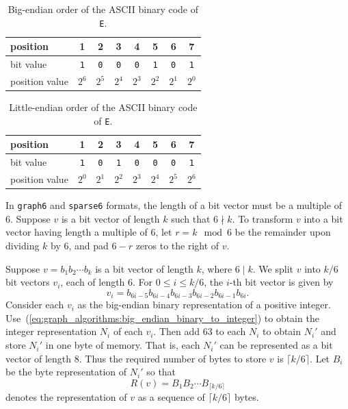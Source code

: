 \begin{table}[!htbp]
\centering
\begin{tabular}{|l|ccccccc|} \hline
position       & 1          & 2          & 3          & 4          & 5          & 6          & 7 \\\hline
bit value      & \texttt{1} & \texttt{0} & \texttt{0} & \texttt{0} & \texttt{1} & \texttt{0} & \texttt{1} \\\hline
position value & $2^6$      & $2^5$      & $2^4$      & $2^3$      & $2^2$      & $2^1$      & $2^0$ \\\hline
\end{tabular}
\caption{Big-endian order of the ASCII binary code of \texttt{E}.}
\label{tab:graph_algorithms:big_endian_ASCII_binary_E}
\end{table}

\begin{table}[!htbp]
\centering
\begin{tabular}{|l|ccccccc|} \hline
position       & 1          & 2          & 3          & 4          & 5          & 6          & 7 \\\hline
bit value      & \texttt{1} & \texttt{0} & \texttt{1} & \texttt{0} & \texttt{0} & \texttt{0} & \texttt{1} \\\hline
position value & $2^0$      & $2^1$      & $2^2$      & $2^3$      & $2^4$      & $2^5$      & $2^6$ \\\hline
\end{tabular}
\caption{Little-endian order of the ASCII binary code of \texttt{E}.}
\label{tab:graph_algorithms:little_endian_ASCII_binary_E}
\end{table}

In {\tt graph6} and {\tt sparse6} formats, the length of a bit vector must be a
multiple of 6. Suppose $v$ is a bit vector of length $k$ such that
$6 \nmid k$. To transform $v$ into a bit vector having length a
multiple of 6, let $r = k \mod 6$ be the remainder upon dividing $k$
by 6, and pad $6 - r$ zeros to the right of $v$.

Suppose $v = b_1 b_2 \cdots b_k$ is a bit vector of length $k$, where
$6 \;|\; k$. We split $v$ into $k/6$ bit vectors $v_i$, each of length
6. For $0 \leq i \leq k/6$, the $i$-th bit vector is given by
\[
v_i
=
b_{6i-5} b_{6i-4} b_{6i-3} b_{6i-2} b_{6i-1} b_{6i}.
\]
Consider each $v_i$ as the big-endian binary representation of a
positive
integer. Use~(\ref{eq:graph_algorithms:big_endian_binary_to_integer})
to obtain the integer representation $N_i$ of each $v_i$. Then add 63
to each $N_i$ to obtain $N_i'$ and store $N_i'$ in one byte of
memory. That is, each $N_i'$ can be represented as a bit vector of
length $8$. Thus the required number of bytes to store $v$ is
$\lceil k/6 \rceil$. Let $B_i$ be the byte representation of $N_i'$ so
that
%
\begin{equation}
\label{eq:graph_algorithms:byte_representation_bit_vector}
R(v)
=
B_1 B_2 \cdots B_{\lceil k/6 \rceil}
\end{equation}
%
denotes the representation of $v$ as a sequence of $\lceil k/6 \rceil$
bytes.

